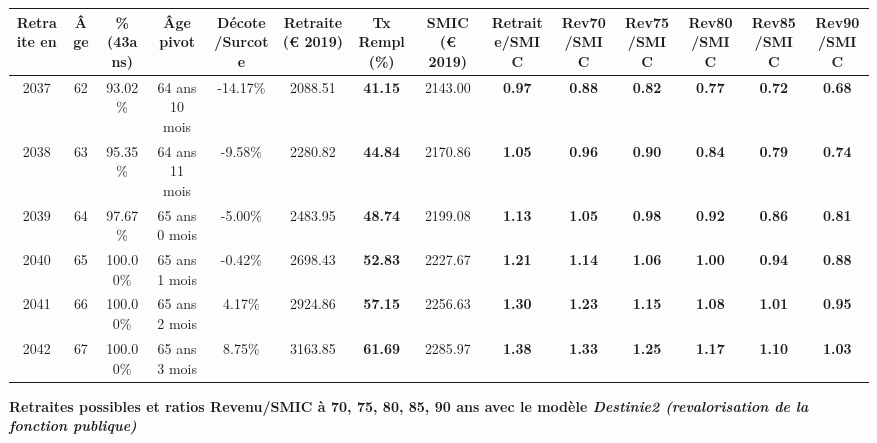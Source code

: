 \begin{adjustbox}{max width=\textwidth} 
\begin{tabular}[htb]{|c|c||c|c|c||c|c||c||c|c|c|c|c|c|} 
\hline 
 Retraite en &  Âge &  \%(43ans) &  Âge pivot &  Décote/Surcote &  Retraite (\euro{} 2019) &  Tx Rempl(\%) &  SMIC (\euro{} 2019) &  Retraite/SMIC &  Rev70/SMIC &  Rev75/SMIC &  Rev80/SMIC &  Rev85/SMIC &  Rev90/SMIC \\ 
\hline \hline 
 2037 &  62 &  93.02\% &  64 ans 10 mois &  -14.17\% &  2088.51 &  {\bf 41.15} &  2143.00 &  {\bf {\color{red} 0.97}} &  {\bf {\color{red} 0.88}} &  {\bf {\color{red} 0.82}} &  {\bf {\color{red} 0.77}} &  {\bf {\color{red} 0.72}} &  {\bf {\color{red} 0.68}} \\ 
\hline 
 2038 &  63 &  95.35\% &  64 ans 11 mois &  -9.58\% &  2280.82 &  {\bf 44.84} &  2170.86 &  {\bf 1.05} &  {\bf {\color{red} 0.96}} &  {\bf {\color{red} 0.90}} &  {\bf {\color{red} 0.84}} &  {\bf {\color{red} 0.79}} &  {\bf {\color{red} 0.74}} \\ 
\hline 
 2039 &  64 &  97.67\% &  65 ans 0 mois &  -5.00\% &  2483.95 &  {\bf 48.74} &  2199.08 &  {\bf 1.13} &  {\bf 1.05} &  {\bf {\color{red} 0.98}} &  {\bf {\color{red} 0.92}} &  {\bf {\color{red} 0.86}} &  {\bf {\color{red} 0.81}} \\ 
\hline 
 2040 &  65 &  100.00\% &  65 ans 1 mois &  -0.42\% &  2698.43 &  {\bf 52.83} &  2227.67 &  {\bf 1.21} &  {\bf 1.14} &  {\bf 1.06} &  {\bf {\color{red} 1.00}} &  {\bf {\color{red} 0.94}} &  {\bf {\color{red} 0.88}} \\ 
\hline 
 2041 &  66 &  100.00\% &  65 ans 2 mois &  4.17\% &  2924.86 &  {\bf 57.15} &  2256.63 &  {\bf 1.30} &  {\bf 1.23} &  {\bf 1.15} &  {\bf 1.08} &  {\bf 1.01} &  {\bf {\color{red} 0.95}} \\ 
\hline 
 2042 &  67 &  100.00\% &  65 ans 3 mois &  8.75\% &  3163.85 &  {\bf 61.69} &  2285.97 &  {\bf 1.38} &  {\bf 1.33} &  {\bf 1.25} &  {\bf 1.17} &  {\bf 1.10} &  {\bf 1.03} \\ 
\hline 
\hline 
\end{tabular} 
\end{adjustbox} 
 
 \vspace{0.1cm} 
{\bf \noindent Retraites possibles et ratios Revenu/SMIC à 70, 75, 80, 85, 90 ans avec le modèle \emph{Destinie2 (revalorisation de la fonction publique)}}  
 
